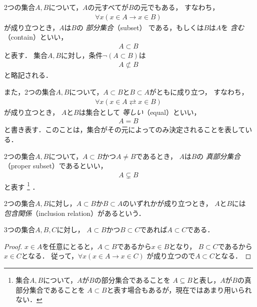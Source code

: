  2つの集合$A,  B$について，$A$の元すべてが$B$の元でもある，
 すなわち，
 \begin{align*}
   \forall x (x \in A \to x \in B)
 \end{align*}
 が成り立つとき，$A$は$B$の
 \emph{部分集合}（subset）
 である，もしくは$B$は$A$を
 \emph{含む}（contain）といい，
 \begin{align}
   A \subset B
   \label{eq:defsubset}
 \end{align}
 と表す．
 集合$A,  B$に対し，条件$\lnot ( A \subset B )$は
 \begin{align}
   A \not\subset B 
   \label{eq:nsubset}
 \end{align}
 と略記される．

 また，2つの集合$A,  B$について，$A \subset B$と$B \subset A$がともに成り立つ，
 すなわち，
 \begin{align*}
   \forall x (x \in A \rightleftarrows x \in B)
 \end{align*}
 が成り立つとき，
 $A$と$B$は集合として \emph{等しい}（equal）といい，
 \begin{align}
   A = B
   \label{eq:setequal}
 \end{align}
 と書き表す．このことは，集合がその元によってのみ決定されることを表している．
 
 2つの集合$A,  B$について，$A \subset B$かつ$A \neq B$であるとき，
 $A$は$B$の
 \emph{真部分集合}（proper subset）であるといい，
 \begin{align}
   A \subsetneq B
   \label{eq:propersubset}
 \end{align}
 と表す
 \footnote{集合$A,  B$について，$A$が$B$の部分集合であることを
           $A \subseteq B$と表し，$A$が$B$の真部分集合であることを
           $A \subset B$と表す場合もあるが，現在ではあまり用いられない．}
 ．
 
 2つの集合$A,  B$に対し，$A \subset B$か$B \subset A$のいずれかが成り立つとき，
 $A$と$B$には
 \emph{包含関係}（inclusion relation）があるという．

 \begin{thm} \label{thm:hougansuii}
   3つの集合$A,  B,  C$に対し，
   $A \subset B$かつ$B \subset C$であれば$A \subset C$である．
 \end{thm}
 \begin{proof}
   $x \in A$を任意にとると，$A \subset B$であるから$x \in B$となり，
   $B \subset C$であるから$x \in C$となる．
   従って，$\forall x ( x \in A \to x \in C)$
   が成り立つので$A \subset C$となる．
 \end{proof}

